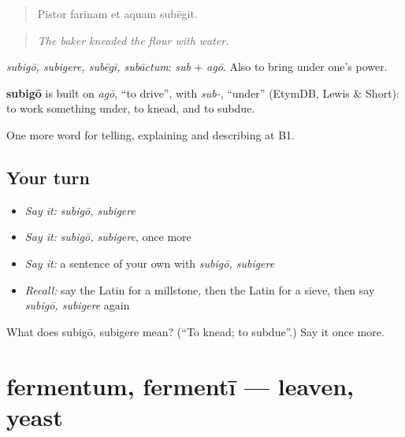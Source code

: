 \begin{quote}
Pistor farīnam et aquam subēgit.
\end{quote}

\begin{quote}
\emph{The baker kneaded the flour with water.}
\end{quote}

\emph{subigō, subigere, subēgī, subāctum}: \emph{sub} + \emph{agō}. Also to bring under one's power.

\begin{cousinweb}
\textbf{subigō} is built on \emph{agō}, \textquotedblleft{}to drive\textquotedblright{}, with \emph{sub-}, \textquotedblleft{}under\textquotedblright{} (EtymDB, Lewis \& Short): to work something under, to knead, and to subdue.
\end{cousinweb}

\begin{grammarlens}[title={What you've built}]
One more word for telling, explaining and describing at B1.
\end{grammarlens}

\subsection*{Your turn}
\begin{itemize}
\raggedright
  \item \emph{Say it:} \emph{subigō, subigere}
  \item \emph{Say it:} \emph{subigō, subigere}, once more
  \item \emph{Say it:} a sentence of your own with \emph{subigō, subigere}
  \item \emph{Recall:} say the Latin for a millstone, then the Latin for a sieve, then say \emph{subigō, subigere} again
\end{itemize}

\begin{tcolorbox}[breakable,colback=teal!4,colframe=teal!35!black,title={Before you move on}]
What does subigō, subigere mean? (\textquotedblleft{}To knead; to subdue\textquotedblright{}.) Say it once more.
\end{tcolorbox}
\section[fermentum, fermentī]{fermentum, fermentī — leaven, yeast}

\label{lesson:LA-C352-fermentum}



